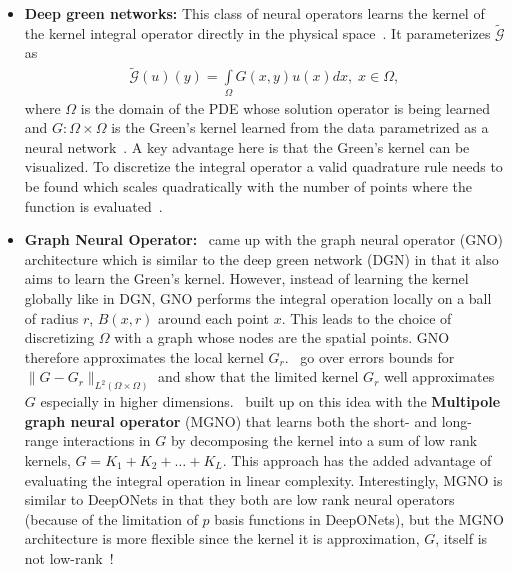 \documentclass[12pt]{exam}
\def\G{\mathcal{G}}
\begin{document}
\begin{questions}
\begin{itemize}
\item {\bf Deep green networks:} This class of neural operators learns the kernel of the kernel integral operator directly in the physical space~\citep{gin2021deepgreen, boulle2022data}. It parameterizes $\tilde{\G}$ as
\begin{align}
\tilde{\G}(u)(y) = \int\limits_{\Omega} G(x, y) u(x) dx, \; x \in \Omega,
\end{align}
where $\Omega$ is the domain of the PDE whose solution operator is being learned and $G: \Omega \times \Omega$ is the Green's kernel learned from the data parametrized as a neural network~\citep{boulle2022data}. A key advantage here is that the Green's kernel can be visualized. To discretize the integral operator a valid quadrature rule needs to be found which scales quadratically with the number of points where the function is evaluated~\citep{boulle2024mathematical}.

\item {\bf Graph Neural Operator:}~\citep{li2020neural} came up with the graph neural operator (GNO) architecture which is similar to the deep green network (DGN) in that it also aims to learn the Green's kernel. However, instead of learning the kernel globally like in DGN, GNO performs the integral operation locally on a ball of radius $r$, $B(x, r)$ around each point $x$. This leads to the choice of discretizing $\Omega$ with a graph whose nodes are the spatial points. GNO therefore approximates the local kernel $G_r$.~\citep{li2020neural} go over errors bounds for $\|G - G_r\|_{L^2(\Omega \times \Omega)}$ and show that the limited kernel $G_r$ well approximates $G$ especially in higher dimensions.~\citep{li2020multipole} built up on this idea with the {\bf Multipole graph neural operator} (MGNO) that learns both the short- and long-range interactions in $G$ by decomposing the kernel into a sum of low rank kernels, $G = K_1 + K_2 + \dots + K_L$. This approach has the added advantage of evaluating the integral operation in linear complexity. Interestingly, MGNO is similar to DeepONets in that they both are low rank neural operators (because of the limitation of $p$ basis functions in DeepONets), but the MGNO architecture is more flexible since the kernel it is approximation, $G$, itself is not low-rank~\citep{boulle2024mathematical}!


\end{itemize}
\end{questions}
\end{document}
